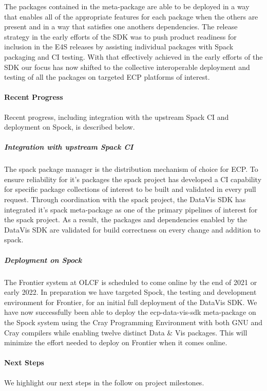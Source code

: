 The packages contained in the meta-package are able to be deployed in a way that enables all of the appropriate features for each package when the others are present and in a way that satisfies one anothers dependencies. The release strategy in the early efforts of the SDK was to push product readiness for inclusion in the E4S releases by assisting individual packages with Spack packaging and CI testing. With that effectively achieved in the early efforts of the SDK our focus has now shifted to the collective interoperable deployment and testing of all the packages on targeted ECP platforms of interest.

\paragraph{Recent Progress} Recent progress, including integration with the upstream Spack CI and deployment on Spock, is described below.

\subparagraph{Integration with upstream Spack CI}

The spack package manager is the distribution mechanism of choice for ECP.  To ensure reliability for it's packages the spack project has developed a CI capability for specific package collections of interest to be built and validated in every pull request.  Through coordination with the spack project, the DataVis SDK has integrated it's spack meta-package as one of the primary pipelines of interest for the spack project. As a result, the packages and dependencies enabled by the DataVis SDK are validated for build correctness on every change and addition to spack.

\subparagraph{Deployment on Spock}

The Frontier system at OLCF is scheduled to come online by the end of 2021 or early 2022. In preparation we have targeted Spock, the testing and development environment for Frontier, for an initial full deployment of the DataVis SDK.  We have now successfully been able to deploy the ecp-data-vis-sdk meta-package on the Spock system using the Cray Programming Environment with both GNU and Cray compilers while enabling twelve distinct Data \& Vis packages.  This will minimize the effort needed to deploy on Frontier when it comes online.

\paragraph{Next Steps}
We highlight our next steps in the follow on project milestones.

